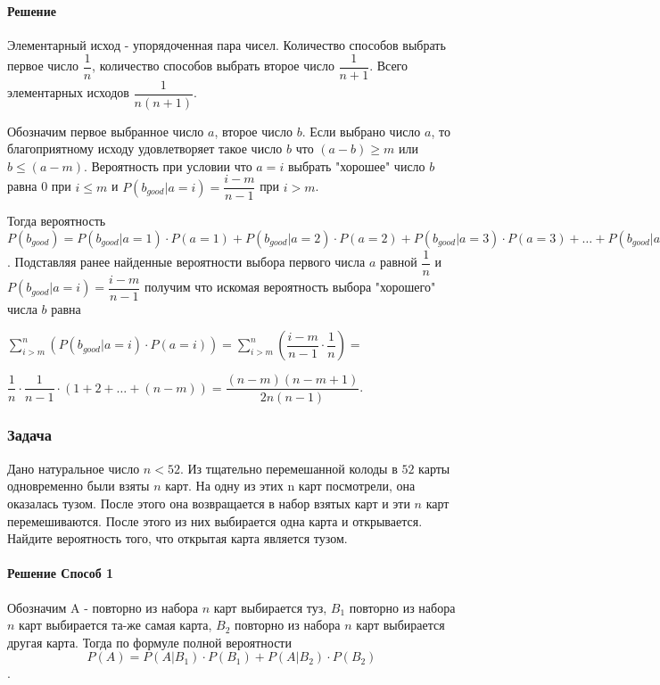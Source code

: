 \documentclass[a4paper,12pt]{article}
\begin{document}
\paragraph{Решение}
Элементарный исход - упорядоченная пара чисел. Количество способов выбрать первое число \( \dfrac{1}{n} \), количество способов выбрать второе число \( \dfrac{1}{n+1} \). Всего элементарных исходов \( \dfrac{1}{n(n+1)} \).

Обозначим первое выбранное число \(a\), второе число \(b\). Если выбрано число \(a\), то благоприятному исходу удовлетворяет такое число \(b\) что \( (a-b) \geqslant m\) или \( b \leqslant (a - m) \). Вероятность при условии что \(a=i\) выбрать "хорошее" число \(b\) равна 0 при \(i \leqslant m\) и \( P(b_{good}|a=i) = \dfrac{i-m}{n-1} \) при \( i > m \).

Тогда вероятность \( P(b_{good}) = P(b_{good}|a=1) \cdot P(a=1) + P(b_{good}|a=2) \cdot P(a=2) + P(b_{good}|a=3) \cdot P(a=3) + \ldots + P(b_{good}|a=n) \cdot P(a=n) = \sum_{i > m}^{n} \left( P(b_{good}|a=i) \cdot P(a=i) \right) \). Подставляя ранее найденные вероятности выбора первого числа \(a\) равной \(\dfrac{1}{n}\) и \( P(b_{good}|a=i) = \dfrac{i-m}{n-1} \) получим что искомая вероятность выбора "хорошего" числа \(b\) равна 

\( \sum_{i > m}^{n} \left( P(b_{good}|a=i) \cdot P(a=i) \right) =
 \sum_{i > m}^{n} \left( \dfrac{i-m}{n-1} \cdot \dfrac{1}{n} \right) = \) 

\(\dfrac{1}{n} \cdot \dfrac{1}{n-1} \cdot \left( 1+2+\ldots + (n-m) \right) = \dfrac{(n-m)(n-m+1)}{2n(n-1)} \).


\subsubsection*{Задача}
Дано натуральное число \(n<52\). Из тщательно перемешанной колоды в \(52\) карты одновременно были взяты \(n\) карт. На одну из этих n карт посмотрели, она оказалась тузом. После этого она возвращается в набор взятых карт и эти \(n\) карт перемешиваются. После этого из них выбирается одна карта и открывается. Найдите вероятность того, что открытая карта является тузом.
\paragraph{Решение Способ 1}
Обозначим A - повторно из набора \(n\) карт выбирается туз, \(B_1\) повторно из набора \(n\) карт выбирается та-же самая карта, \(B_2\) повторно из набора \(n\) карт выбирается другая карта. Тогда по формуле полной вероятности \[ P(A) = P(A|B_1) \cdot P(B_1) + P(A|B_2) \cdot P(B_2) \].
\end{document}

